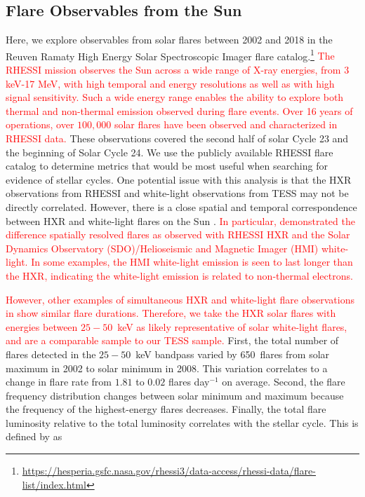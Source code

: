 \documentclass[twocolumn, linenumbers]{aastex631}
\begin{document}
\subsection{Flare Observables from the Sun}

Here, we explore observables from solar flares between 2002 and 2018 in the Reuven
Ramaty High Energy Solar Spectroscopic Imager \citep[RHESSI;][]{lin02} flare
catalog.\footnote{\url{https://hesperia.gsfc.nasa.gov/rhessi3/data-access/rhessi-data/flare-list/index.html}}
\textcolor{red}{The RHESSI mission observes the Sun across a wide range of X-ray energies,
from 3 keV-17 MeV, with high temporal and energy resolutions as well as with high signal
sensitivity. Such a wide energy range enables the ability to explore both thermal and
non-thermal emission observed during flare events. Over 16 years of operations, over
$100,000$ solar flares have been observed and characterized in RHESSI data.} These
observations covered the second half of solar Cycle 23 and the beginning of Solar
Cycle 24. We use the publicly available RHESSI flare catalog to determine  metrics
that would be most useful when searching for evidence of stellar cycles. One potential
issue with this analysis is that the HXR observations from RHESSI and white-light
observations from TESS may not be directly correlated. However, there is a close spatial
and temporal correspondence between HXR and white-light flares on the Sun
\citep{fletcher07, krucker11, kleint16}. \textcolor{red}{In particular, \cite{namekata17}
demonstrated the difference spatially resolved flares as observed with RHESSI HXR and the
Solar Dynamics Observatory (SDO)/Helioseismic and Magnetic Imager (HMI) white-light. In
some examples, the HMI white-light emission is seen to last longer than the HXR,
indicating the white-light emission is related to non-thermal electrons.}

\textcolor{red}{However, other examples of simultaneous HXR and white-light flare
observations in \citep{namekata17} show similar flare durations. Therefore, we take
the HXR solar flares with energies between $25 - 50$~keV as likely representative
of solar white-light flares, and are a comparable sample to our TESS sample.} First,
the total number of flares detected in the $25 - 50$~keV bandpass varied by 650~flares
from solar maximum in 2002 to solar minimum in 2008. This variation correlates to
a change in flare rate from $1.81$ to $0.02$ flares day$^{-1}$ on average. Second,
the flare frequency distribution changes between solar minimum and maximum because
the frequency of the highest-energy flares decreases.  Finally, the total flare
luminosity relative to the total luminosity correlates with the stellar cycle.
This is defined by \cite{lurie15} as
\end{document}
